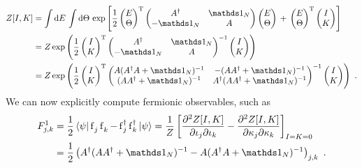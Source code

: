\documentclass[letter]{article}
\newcommand{\intd}[1]{\int\mathrm{d}#1\,}
\begin{document}
\begin{align}
Z[I,K] &= \intd{E}\intd{\Theta}
\exp\left[
\frac{1}{2}
\begin{pmatrix}
E \\
\Theta
\end{pmatrix}^\mathrm{T}
\begin{pmatrix}
A^\dagger & \id_N \\
-\id_N    & A
\end{pmatrix}
\begin{pmatrix}
E \\
\Theta
\end{pmatrix} 
\,+\, 
\begin{pmatrix}
E \\
\Theta
\end{pmatrix}^\mathrm{T}
\begin{pmatrix}
I \\
K 
\end{pmatrix}
\right] \nonumber\\
&= Z \exp\left(\frac{1}{2} \begin{pmatrix}
I \\
K 
\end{pmatrix}^\mathrm{T}
\begin{pmatrix}
A^\dagger & \id_N \\
-\id_N    & A
\end{pmatrix}^{-1}
\begin{pmatrix}
I \\
K 
\end{pmatrix}
\right)  \nonumber\\
&=
Z \exp\left(
\frac{1}{2} 
\begin{pmatrix}
I \\
K 
\end{pmatrix}^\mathrm{T}
\begin{pmatrix}
A (A^\dagger A + \id_N)^{-1} & -(A A^\dagger + \id_N)^{-1} \\
(A A^\dagger + \id_N)^{-1}  & A^\dagger (A A^\dagger + \id_N)^{-1}
\end{pmatrix}^{-1}
\begin{pmatrix}
I \\
K 
\end{pmatrix}
\right) \ .
\end{align}
We can now explicitly compute fermionic observables, such as
\begin{align}
F^1_{j,k} &= \frac{1}{2}\sandwich{\psi}{\fe_j \fe_k - \fd_j \fd_k}{\psi} = \frac{1}{Z} \left[ \frac{\partial^2 Z[I,K]}{\partial\iota_j\partial\iota_k} - \frac{\partial^2 Z[I,K]}{\partial\kappa_j\partial\kappa_k} \right]_{I=K=0} \nonumber\\
&= \frac{1}{2}\left( A^\dagger (A A^\dagger + \id_N)^{-1} - A (A^\dagger A + \id_N)^{-1} \right)_{j,k}\ .
\end{align}
\end{document}
